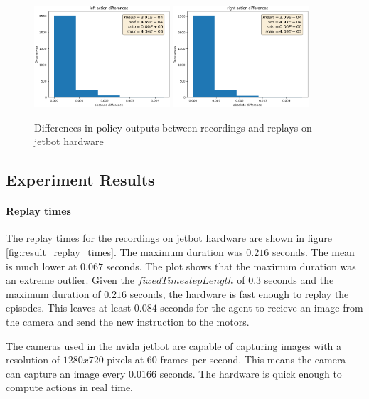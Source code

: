 \begin{figure}
    \centering
    \includegraphics[width=0.45\textwidth]{Bilder/notebook_images/replay_outputs_action_left.png}
    \includegraphics[width=0.45\textwidth]{Bilder/notebook_images/replay_outputs_action_right.png}
    \caption{Differences in policy outputs between recordings and replays on jetbot hardware}
    \label{fig:result_replay_outputs}
\end{figure} %


\subsection{Experiment Results}

\paragraph{Replay times}

The replay times for the recordings on jetbot hardware are shown in figure \ref{fig:result_replay_times}. The maximum duration was $0.216$ seconds. The mean is much lower at $0.067$ seconds. The plot shows that the maximum duration was an extreme outlier.
Given the $fixedTimestepLength$ of $0.3$ seconds and the maximum duration of $0.216$ seconds, the hardware is fast enough to replay the episodes. This leaves at least $0.084$ seconds for the agent to recieve an image from the camera and send the new instruction to the motors.

The cameras used in the nvida jetbot are capable of capturing images with a resolution of $1280x720$ pixels at $60$ frames per second. This means the camera can capture an image every $0.0166$ seconds. The hardware is quick enough to compute actions in real time.

